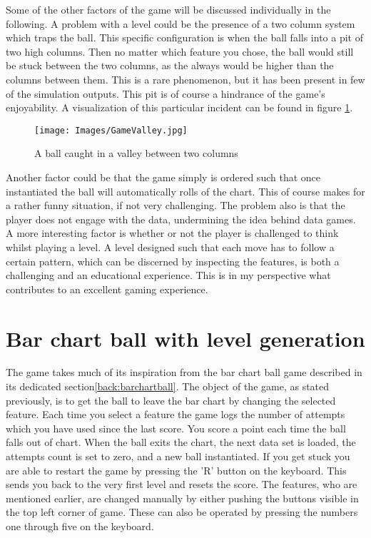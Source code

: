 \documentclass[a4paper,11pt]{article}
\begin{document}
Some of the other factors of the game will be discussed individually in the following. A problem with a level could be the presence of a two column system which traps the ball. This specific configuration is when the ball falls into a pit of two high columns. Then no matter which feature you chose, the ball would still be stuck between the two columns, as the always would be higher than the columns between them. This is a rare phenomenon, but it has been present in few of the simulation outputs. This pit is of course a hindrance of the game's enjoyability. A visualization of this particular incident can be found in figure \ref{fig:gamevalley}.
\begin{figure}[h]
    \centering
    \texttt{[image: Images/GameValley.jpg]}
    \caption{A ball caught in a valley between two columns}
    \label{fig:gamevalley}
\end{figure}
Another factor could be that the game simply is ordered such that once instantiated the ball will automatically rolls of the chart. This of course makes for a rather funny situation, if not very challenging. The problem also is that the player does not engage with the data, undermining the idea behind data games. 
A more interesting factor is whether or not the player is challenged to think whilst playing a level. A level designed such that each move has to follow a certain pattern, which can be discerned by inspecting the features, is both a challenging and an educational experience. This is in my perspective what contributes to an excellent gaming experience.

\section{Bar chart ball with level generation}
The game takes much of its inspiration from the bar chart ball game described in its dedicated section\ref{back:barchartball}. The object of the game, as stated previously, is to get the ball to leave the bar chart by changing the selected feature. Each time you select a feature the game logs the number of attempts which you have used since the last score. You score a point each time the ball falls out of chart. When the ball exits the chart, the next data set is loaded, the attempts count is set to zero, and a new ball instantiated. If you get stuck you are able to restart the game by pressing the 'R' button on the keyboard. This sends you back to the very first level and resets the score. The features, who are mentioned earlier, are changed manually by either pushing the buttons visible in the top left corner of game. These can also be operated by pressing the numbers one through five on the keyboard. 
\end{document}
